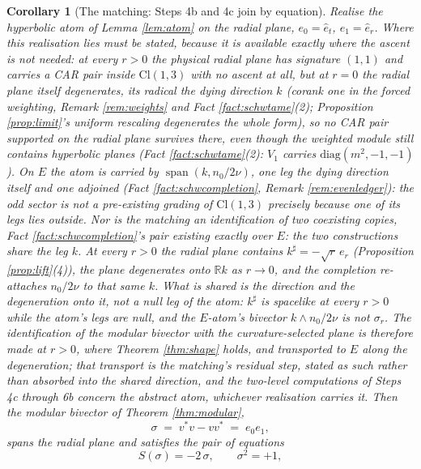 \documentclass[11pt]{article}
\newtheorem{corollary}[theorem]{Corollary}
\theoremstyle{definition}
\newcommand{\Cl}{\mathrm{Cl}}
\newcommand{\R}{\mathbb{R}}
\newcommand{\er}{e_r}
\newcommand{\nO}{n_0}
\begin{document}
\begin{corollary}[The matching: Steps 4b and 4c join by equation]\label{cor:weld}
Realise the hyperbolic atom of Lemma \ref{lem:atom} on the radial plane, $e_0 = \hat e_t$, $e_1 = \hat e_r$. Where this realisation lies must be stated, because it is available exactly where the ascent is not needed: at every $r > 0$ the physical radial plane has signature $(1,1)$ and carries a CAR pair inside $\Cl(1,3)$ with no ascent at all, but at $r = 0$ the radial plane itself degenerates, its radical the dying direction $k$ (corank one in the forced weighting, Remark \ref{rem:weights} and Fact \ref{fact:schwtame}(2); Proposition \ref{prop:limit}'s uniform rescaling degenerates the whole form), so no CAR pair supported on the radial plane survives there, even though the weighted module still contains hyperbolic planes (Fact \ref{fact:schwtame}(2): $V_1$ carries $\mathrm{diag}(m^2, -1, -1)$). On $E$ the atom is carried by $\operatorname{span}(k, \nO/2\nu)$, one leg the dying direction itself and one adjoined (Fact \ref{fact:schwcompletion}, Remark \ref{rem:evenledger}): the odd sector is not a pre-existing grading of $\Cl(1,3)$ precisely because one of its legs lies outside. Nor is the matching an identification of two coexisting copies, Fact \ref{fact:schwcompletion}'s pair existing exactly over $E$: the two constructions share the leg $k$. At every $r > 0$ the radial plane contains $k^{\sharp} = -\sqrt r\,\er$ (Proposition \ref{prop:lift}(4)), the plane degenerates onto $\R k$ as $r \to 0$, and the completion re-attaches $\nO/2\nu$ to that same $k$. What is shared is the direction and the degeneration onto it, not a null leg of the atom: $k^{\sharp}$ is spacelike at every $r > 0$ while the atom's legs are null, and the $E$-atom's bivector $k \wedge \nO/2\nu$ is not $\sigma_r$. The identification of the modular bivector with the curvature-selected plane is therefore made at $r > 0$, where Theorem \ref{thm:shape} holds, and \emph{transported} to $E$ along the degeneration; that transport is the matching's residual step, stated as such rather than absorbed into the shared direction, and the two-level computations of Steps 4c through 6b concern the abstract atom, whichever realisation carries it. Then the modular bivector of Theorem \ref{thm:modular},
\[
\sigma \;=\; v^*v - vv^* \;=\; e_0 e_1 ,
\]
spans the radial plane and satisfies the pair of equations
\[
S(\sigma) = -2\,\sigma, \qquad \sigma^2 = +1 ,
\]

\end{corollary}
\end{document}
